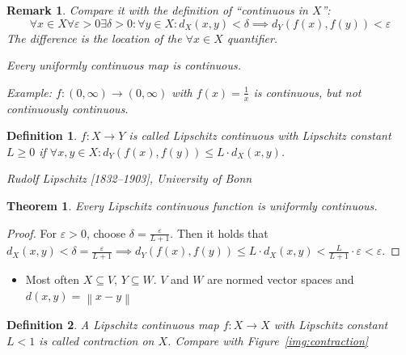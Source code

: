 \documentclass{article}
\newtheorem{theorem}{Theorem}  \numberwithin{theorem}{section}
\newtheorem{definition}{Definition}  \numberwithin{definition}{section}
\newtheorem{remark}{Remark}  \numberwithin{remark}{section}
\newcommand{\norm}[1]{\left\|#1\right\|}
\begin{document}
\begin{remark}
  Compare it with the definition of \enquote{continuous in $X$}:
  \[ \forall x \in X \forall \varepsilon > 0 \exists \delta > 0: \forall y \in X: d_X(x,y) < \delta \implies d_Y(f(x), f(y)) < \varepsilon \]
  The difference is the location of the $\forall x \in X$ quantifier.

  Every uniformly continuous map is continuous.

  Example: $f: (0, \infty) \to (0, \infty)$ with $f(x) = \frac1x$ is continuous, but not continuously continuous.
\end{remark}

\begin{definition} %
  $f: X \to Y$ is called \emph{Lipschitz continuous} with \emph{Lipschitz constant} $L \geq 0$ if $\forall x, y \in X: d_Y(f(x), f(y)) \leq L \cdot d_X(x,y)$.

  Rudolf Lipschitz [1832--1903], University of Bonn
\end{definition}

\begin{theorem}
  Every Lipschitz continuous function is uniformly continuous.
\end{theorem}
\begin{proof}
  For $\varepsilon > 0$, choose $\delta = \frac{\varepsilon}{L+1}$. Then it holds that
  $d_X(x,y) < \delta = \frac{\varepsilon}{L+1} \implies d_Y(f(x), f(y)) \leq L \cdot d_X(x,y) < \frac{L}{L+1} \cdot \varepsilon < \varepsilon$.
\end{proof}

\begin{itemize}
  \item Most often $X \subseteq V$, $Y \subseteq W$. $V$ and $W$ are normed vector spaces and $d(x, y) = \norm{x - y}$
\end{itemize}

\begin{definition} %
  A Lipschitz continuous map $f: X \to X$ with Lipschitz constant $L < 1$ is called \emph{contraction on $X$}. Compare with Figure~\ref{img:contraction}
\end{definition}
\end{document}
